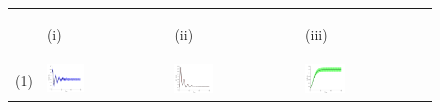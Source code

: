 \documentclass[12pt]{UOthesis}
\theoremstyle{remarkstyle}
\begin{document}
\begin{figure}[h!]
	\centering
	\begin{tabular}{m{0.07cm} m{4.5cm}  m{4.5cm}  m{4.5cm}}
		& \begin{center}
			(i)
		\end{center} & \begin{center}
			(ii)
		\end{center} & \begin{center}
			(iii)
		\end{center}\\
		(1) & \includegraphics[width=0.33\textwidth]{HLOSolCompareSSHare1.png} & \includegraphics[width=0.33\textwidth]{HLOSolCompareSSLynx1.png} & \includegraphics[width=0.33\textwidth]{HLOSolCompareSSOwl1.png}\\
		

\end{tabular}
\end{figure}
\end{document}
